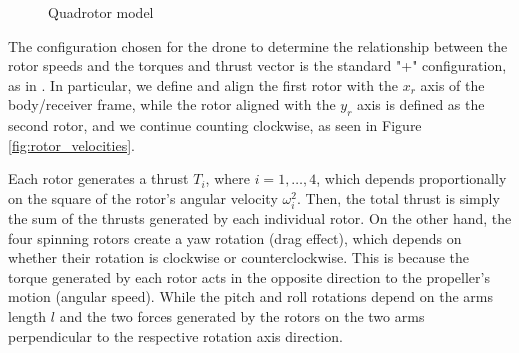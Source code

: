 \begin{figure}
    \caption{Quadrotor model }
\end{figure}
The configuration chosen for the drone to determine the 
relationship between the rotor speeds and the torques 
and thrust vector is the standard "+" configuration, 
as in \cite{figura_bella_drone, model_quadrotor, 
quadrotor_modeling_control_book, backstepping_control, geometric_control}. 
In particular, we define and align the first rotor with the \( x_r \) 
axis of the body/receiver frame, while the rotor aligned with the \( y_r \) 
axis is defined as the second rotor, and we continue counting clockwise,
as seen in Figure \ref{fig:rotor_velocities}.

Each rotor generates a thrust \( T_i \), where \( i = 1, \dots, 4 \), 
which depends proportionally on the square of the rotor's angular velocity \( \omega_i^2 \). 
Then, the total thrust is simply the sum of the thrusts generated by each individual rotor. 
On the other hand, the four spinning rotors create a yaw rotation (drag effect), 
which depends on whether their rotation is clockwise or counterclockwise. 
This is because the torque generated by each rotor acts in the opposite 
direction to the propeller's motion (angular speed).
While the pitch and roll rotations depend on the arms length $l$ and the
two forces generated by the rotors on the two arms perpendicular to the respective 
rotation axis direction.

